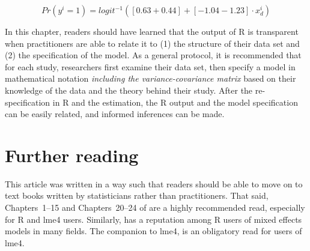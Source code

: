 \documentclass[a4paper,12pt]{article}
\begin{document}
\begin{equation}
  Pr(y^i=1)=logit^{-1}( [0.63+0.44] + [-1.04-1.23]\cdot x_d^i )
  \label{eq:glmm012}
\end{equation}

In this chapter, readers should have learned that the output of R is transparent when practitioners are able to relate it to (1) the structure of their data set and (2) the specification of the model.
As a general protocol, it is recommended that for each study, researchers first examine their data set, then specify a model in mathematical notation \textit{including the variance-covariance matrix} based on their knowledge of the data and the theory behind their study.
After the re-specification in R and the estimation, the R output and the model specification can be easily related, and informed inferences can be made.

\section{Further reading}
\label{sec:furtherreading}

This article was written in a way such that readers should be able to move on to text books written by statisticians rather than practitioners.
That said, Chapters~1--15 and Chapters~20--24 of \citet{GelmanHill2006} are a highly recommended read, especially for R and lme4 users.
Similarly, \citet{ZuurEa2009} has a reputation among R users of mixed effects models in many fields.
The companion to lme4, \citet{Bates2010} is an obligatory read for users of lme4.

\printbibliography
\end{document}

